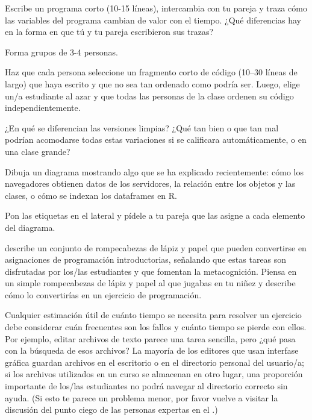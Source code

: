 
Escribe un programa corto (10-15 líneas),
 intercambia con tu pareja y 
traza cómo las variables del programa cambian de valor con el tiempo.
¿Qué diferencias hay en la forma en que tú y tu pareja escribieron sus trazas?


Forma grupos de 3-4 personas.

Haz que cada persona seleccione un fragmento corto de código (10--30 líneas de largo) que haya escrito y que no sea tan ordenado como podría ser.
Luego, elige un/a estudiante al azar y que todas las personas de la clase ordenen su código independientemente.

¿En qué se diferencian las versiones limpias?
¿Qué tan bien o que tan mal podrían acomodarse todas estas variaciones si se calificara automáticamente, o en una clase grande?


Dibuja un diagrama mostrando algo que se ha explicado recientemente: cómo los navegadores obtienen datos de los servidores, la relación entre los objetos y las clases,
o cómo se indexan los dataframes en R.

Pon las etiquetas en el lateral y pídele a tu pareja que las asigne a cada elemento del diagrama.


\cite{Butl2017} describe un conjunto de rompecabezas de lápiz y papel que pueden convertirse en asignaciones de programación introductorias, señalando que estas tareas son disfrutadas por los/las estudiantes y que fomentan la metacognición.
Piensa en un simple rompecabezas de lápiz y papel al que jugabas en tu niñez
y describe cómo lo convertirías en un ejercicio de programación.

Cualquier estimación útil de cuánto tiempo se necesita para resolver un ejercicio 
debe considerar cuán frecuentes son los fallos y cuánto tiempo se pierde con ellos.
Por ejemplo, 
editar archivos de texto parece una tarea sencilla, 
pero ¿qué pasa con la búsqueda de esos archivos?
La mayoría de los editores que usan interfase gráfica guardan archivos en el escritorio o en el directorio personal del usuario/a; si los archivos utilizados en un curso se almacenan en otro lugar, una proporción importante de los/las estudiantes no podrá navegar al directorio correcto sin ayuda.
(Si esto te parece un problema menor, por favor vuelve a visitar la discusión del punto ciego de las personas expertas en el .)


